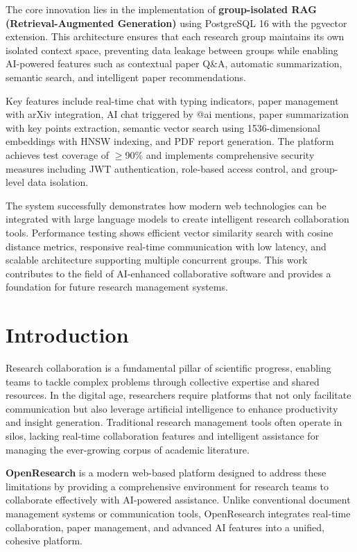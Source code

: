\documentclass[12pt]{report}
\begin{document}
The core innovation lies in the implementation of \textbf{group-isolated RAG (Retrieval-Augmented Generation)} using PostgreSQL 16 with the pgvector extension. This architecture ensures that each research group maintains its own isolated context space, preventing data leakage between groups while enabling AI-powered features such as contextual paper Q\&A, automatic summarization, semantic search, and intelligent paper recommendations.

Key features include real-time chat with typing indicators, paper management with arXiv integration, AI chat triggered by @ai mentions, paper summarization with key points extraction, semantic vector search using 1536-dimensional embeddings with HNSW indexing, and PDF report generation. The platform achieves test coverage of $\geq$90\% and implements comprehensive security measures including JWT authentication, role-based access control, and group-level data isolation.

The system successfully demonstrates how modern web technologies can be integrated with large language models to create intelligent research collaboration tools. Performance testing shows efficient vector similarity search with cosine distance metrics, responsive real-time communication with low latency, and scalable architecture supporting multiple concurrent groups. This work contributes to the field of AI-enhanced collaborative software and provides a foundation for future research management systems.

\newpage
\baselineskip1cm
\setcounter{page}{1} %
\chapter{Introduction}

Research collaboration is a fundamental pillar of scientific progress, enabling teams to tackle complex problems through collective expertise and shared resources. In the digital age, researchers require platforms that not only facilitate communication but also leverage artificial intelligence to enhance productivity and insight generation. Traditional research management tools often operate in silos, lacking real-time collaboration features and intelligent assistance for managing the ever-growing corpus of academic literature.

\textbf{OpenResearch} is a modern web-based platform designed to address these limitations by providing a comprehensive environment for research teams to collaborate effectively with AI-powered assistance. Unlike conventional document management systems or communication tools, OpenResearch integrates real-time collaboration, paper management, and advanced AI features into a unified, cohesive platform.
\end{document}

